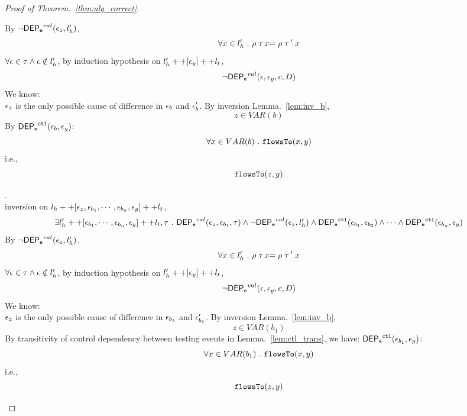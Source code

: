 \documentclass[a4paper,11pt]{article}
\begin{document}
\begin{proof}[Proof of Theorem.~\ref{thm:alg_correct}]
\begin{case}
\begin{subcase}
{By $\neg \mathsf{DEP_{\mathtt{e}}}^{val} (\mathtt{\epsilon}_z, l_h')$, 
\[
  \forall x \in l_h' ~.~
  \rho \mathrel{ {\mathtt{\tau}} \, {x} } = \rho \mathrel{ {\mathtt{\tau}} \, {'} } x
\]
%
$\forall \mathtt{\epsilon} \in \mathtt{\tau} \land \mathtt{\epsilon} \notin l_h'$, by induction hypothesis on $l_{h}' ++ [\mathtt{\epsilon}_y] ++ l_t$, 
\[
  \neg \mathsf{DEP_{\mathtt{e}}}^{val} (\mathtt{\epsilon}, \mathtt{\epsilon}_y, c, D)
\]
%
We know:
\\
%
$\mathtt{\epsilon}_z$ is the only possible cause of difference in $\mathtt{\epsilon}_b$ and $\mathtt{\epsilon}_b'$.
%
By inversion Lemma.~\ref{lem:inv_b}, 
\[
  z \in VAR(b)
\]
%
By $  \mathsf{DEP_{\mathtt{e}}}^{\mathtt{{ctl}}} (\mathtt{\epsilon}_b, \mathtt{\epsilon}_y)$:
\[
  \forall x \in VAR(b) ~.~ \mathtt{flowsTo}(x, y)
\]
i.e.,
\[
  \mathtt{flowsTo}(z, y)
\]
}
%
\end{subcase}
%
\begin{subcase}.
\\
inversion on  $l_h ++ {[\mathtt{\epsilon}_z,  \mathtt{\epsilon}_{b_1}, \cdots, \mathtt{\epsilon}_{b_n},\mathtt{\epsilon}_y]} ++ l_t$, 
\[
  \exists l_{h}' ++ [ \mathtt{\epsilon}_{b_1}, \cdots, \mathtt{\epsilon}_{b_n}, \mathtt{\epsilon}_y] ++ l_t, \mathtt{\tau} ~.~
  \mathsf{DEP_{\mathtt{e}}}^{val}(\mathtt{\epsilon}_z, \mathtt{\epsilon}_{b_1}, \mathtt{\tau})
  \land 
  \neg \mathsf{DEP_{\mathtt{e}}}^{val} (\mathtt{\epsilon}_z, l_h')
  \land 
  \mathsf{DEP_{\mathtt{e}}}^{\mathtt{{ctl}}} (\mathtt{\epsilon}_{b_1}, \mathtt{\epsilon}_{b_2})
  \land 
  \cdots
  \land 
  \mathsf{DEP_{\mathtt{e}}}^{\mathtt{{ctl}}} (\mathtt{\epsilon}_{b_n}, \mathtt{\epsilon}_y)
\]
%
By $\neg \mathsf{DEP_{\mathtt{e}}}^{val} (\mathtt{\epsilon}_z, l_h')$, 
\[
  \forall x \in l_h' ~.~
  \rho \mathrel{ {\mathtt{\tau}} \, {x} } = \rho \mathrel{ {\mathtt{\tau}} \, {'} } x
\]
%
$\forall \mathtt{\epsilon} \in \mathtt{\tau} \land \mathtt{\epsilon} \notin l_h'$, by induction hypothesis on $l_{h}' ++ [\mathtt{\epsilon}_y] ++ l_t$, 
\[
  \neg \mathsf{DEP_{\mathtt{e}}}^{val} (\mathtt{\epsilon}, \mathtt{\epsilon}_y, c, D)
\]
%
We know:
\\
%
$\mathtt{\epsilon}_z$ is the only possible cause of difference in $\mathtt{\epsilon}_{b_1}$ and $\mathtt{\epsilon}_{b_1}'$.
%
By inversion Lemma.~\ref{lem:inv_b}, 
\[
  z \in VAR(b_1)
\]
%
%
By transitivity of control dependency between testing events in Lemma.~\ref{lem:ctl_trans},
we have:
 $ \mathsf{DEP_{\mathtt{e}}}^{\mathtt{{ctl}}} (\mathtt{\epsilon}_{b_1}, \mathtt{\epsilon}_y)$:
\[
  \forall x \in VAR(b_1) ~.~ \mathtt{flowsTo}(x, y)
\]
i.e.,
\[
  \mathtt{flowsTo}(z, y)
\]
%
\end{subcase}
%
\end{case}
%
\end{proof}
\end{document}

